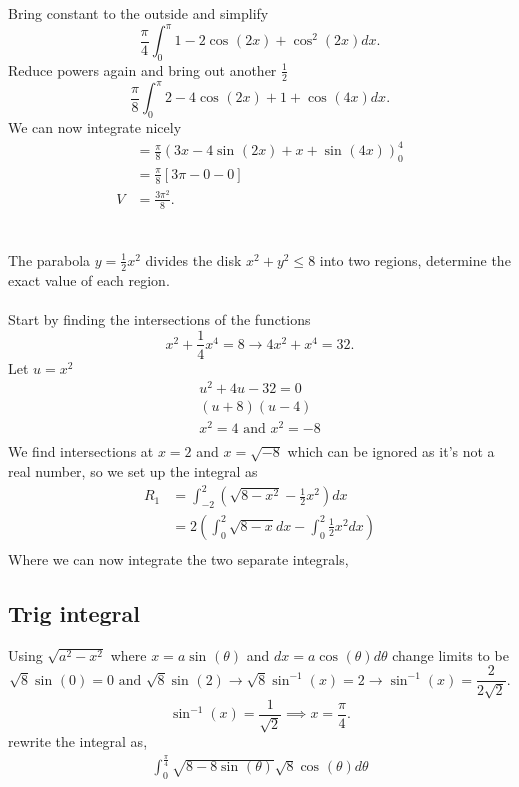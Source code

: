 \documentclass[a4paper]{article}
\begin{document}
Bring constant to the outside and simplify
\[
  \frac{\pi}{4}\int_{0}^{\pi} 1-2\cos^{}(2x)+\cos^{2}(2x)dx
.\] 
Reduce powers again and bring out another $\frac{1}{2}$ 
\[
\frac{\pi}{8}\int_{0}^{\pi } 2-4\cos^{}(2x)+1+\cos^{}(4x)dx
.\]
We can now integrate nicely
\begin{align*}
  &= \frac{\pi}{8}\left( 3x-4\sin^{}(2x)+x+\sin^{}(4x) \right)^{4}_{0} \\
  &= \frac{\pi}{8}[3\pi-0-0] \\
 V &= \frac{3\pi^2}{8} 
.\end{align*}
\newpage
\section{}
The parabola $y=\frac{1}{2}x^2$ divides the disk $x^2+y^2\le 8$ into two regions, determine the exact value of each region. \\
\\
Start by finding the intersections of the functions
\[
x^2+\frac{1}{4}x^{4}=8 \to 4x^2+x^{4}=32
.\] 
Let $u=x^2$ 
\begin{gather*}
u^2+4u-32=0 \\
(u+8)(u-4) \\
x^2 = 4\text{ and } x^2=-8 \\
\end{gather*}
We find intersections at $x=2$ and $x=\sqrt{-8}$ which can be ignored as it's not a real number, so we set up the integral as
\begin{align*}
  R_1 &= \int_{-2}^{2} \left(\sqrt{8-x^2}-\frac{1}{2}x^2\right)dx  \\
  &= 2\left(\int_{0}^{2} \sqrt{8-x}dx -\int_{0}^{2} \frac{1}{2}x^2dx \right) \\
\end{align*}
Where we can now integrate the two separate integrals,

\subsection{Trig integral}%
\label{sub:Trig integral}
Using $\sqrt{a^2-x^2}$ where $x=a\sin^{}(\theta)$ and $dx=a\cos^{}(\theta)d\theta$ change limits to be 
\[
  \sqrt{8}\sin^{}(0) = 0 \text{ and } \sqrt{8}\sin^{}(2) \to \sqrt{8}\sin^{-1}(x)=2 \to \sin^{-1}(x)=\frac{2}{2\sqrt{2}}
.\] 
\[
\sin^{-1}(x)=\frac{1}{\sqrt{2}}\implies x=\frac{\pi}{4}
.\] 
rewrite the integral as, 
\begin{gather*}
\int_{0}^{\frac{\pi}{4}} \sqrt{8-8\sin^{}(\theta)}\sqrt{8}\cos^{}(\theta)d\theta \\
\end{gather*}
\end{document}
